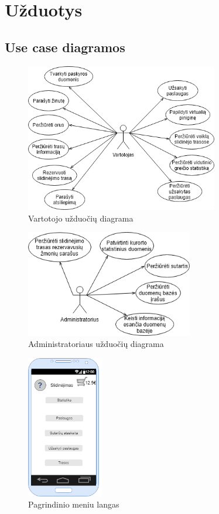 \documentclass[oneside]{VUMIFPSkursinis}
\begin{document}
\section{Užduotys}
\subsection{Use case diagramos}
\begin{figure}[h]
    \centering
    \includegraphics[width=0.75\textwidth]{useCaseVartotojas.png}
    \caption{Vartotojo užduočių diagrama}
    \label{fig:VartotojoUseCasel}
\end{figure}
\vskip 1cm
\begin{figure}[h]
    \centering
    \includegraphics[width=0.65\textwidth]{useCaseAdministratorius.png}
    \caption{Administratoriaus užduočių diagrama}
    \label{fig:AdministratoriausUseCase}
\end{figure}

\begin{figure}[h]
    \centering
    \includegraphics[width=0.30\textwidth]{mainmenu.png}
    \caption{Pagrindinio meniu langas}
    \label{fig:mainmenu}
\end{figure}
\end{document}
